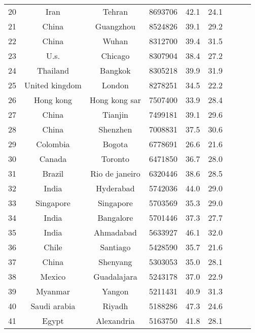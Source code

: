 \begin{table}
\begin{tabular}{ccccccccc}
  20 &                Iran &          Tehran &    8693706 &     42.1 &     24.1 \\
  21 &               China &       Guangzhou &    8524826 &     39.1 &     29.2 \\
  22 &               China &           Wuhan &    8312700 &     39.4 &     31.5 \\
  23 &                U.s. &         Chicago &    8307904 &     38.4 &     27.2 \\
  24 &            Thailand &         Bangkok &    8305218 &     39.9 &     31.9 \\
  25 &      United kingdom &          London &    8278251 &     34.5 &     22.2 \\
  26 &           Hong kong &   Hong kong sar &    7507400 &     33.9 &     28.4 \\
  27 &               China &         Tianjin &    7499181 &     39.1 &     29.6 \\
  28 &               China &        Shenzhen &    7008831 &     37.5 &     30.6 \\
  29 &            Colombia &          Bogota &    6778691 &     26.6 &     21.6 \\
  30 &              Canada &         Toronto &    6471850 &     36.7 &     28.0 \\
  31 &              Brazil &  Rio de janeiro &    6320446 &     38.6 &     28.5 \\
  32 &               India &       Hyderabad &    5742036 &     44.0 &     29.0 \\
  33 &           Singapore &       Singapore &    5703569 &     35.3 &     29.0 \\
  34 &               India &       Bangalore &    5701446 &     37.3 &     27.7 \\
  35 &               India &       Ahmadabad &    5633927 &     46.1 &     32.0 \\
  36 &               Chile &        Santiago &    5428590 &     35.7 &     21.6 \\
  37 &               China &        Shenyang &    5303053 &     35.0 &     28.1 \\
  38 &              Mexico &     Guadalajara &    5243178 &     37.0 &     22.9 \\
  39 &             Myanmar &          Yangon &    5211431 &     40.9 &     31.3 \\
  40 &        Saudi arabia &          Riyadh &    5188286 &     47.3 &     24.6 \\
  41 &               Egypt &      Alexandria &    5163750 &     41.8 &     28.1 \\

\end{tabular}
\end{table}
